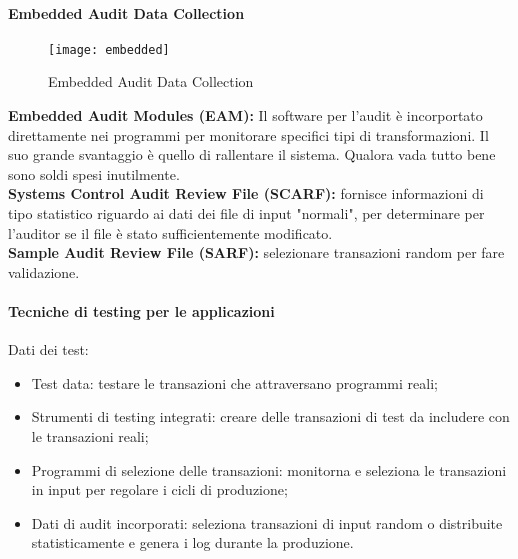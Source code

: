 \paragraph*{Embedded Audit Data Collection}

\begin{figure}[h!]
        \begin{center}
                \texttt{[image: embedded]}
        \end{center}
        \caption{Embedded Audit Data Collection}
        \label{fig:testing:facilities:parallel}
\end{figure}

\textbf{Embedded Audit Modules (EAM):} Il software per l'audit è incorportato direttamente 
nei programmi per monitorare specifici tipi di transformazioni. Il suo grande svantaggio è 
quello di rallentare il sistema. Qualora vada tutto bene sono soldi spesi inutilmente.\\
\newline
\textbf{Systems Control Audit Review File (SCARF):} fornisce informazioni di tipo statistico 
riguardo ai dati dei file di input "normali", per determinare per l'auditor se il file è 
stato sufficientemente modificato.\\
\newline
\textbf{Sample Audit Review File (SARF):} selezionare transazioni random per fare validazione.\\

\paragraph{Tecniche di testing per le applicazioni}

Dati dei test:
\begin{itemize}
    \item Test data: testare le transazioni che attraversano programmi reali;
    \item Strumenti di testing integrati: creare delle transazioni di test da includere con 
    le transazioni reali;
    \item Programmi di selezione delle transazioni: monitorna e seleziona le transazioni in input 
    per regolare i cicli di produzione;
    \item Dati di audit incorporati: seleziona transazioni di input random o distribuite statisticamente 
    e genera i log durante la produzione.
\end{itemize}

